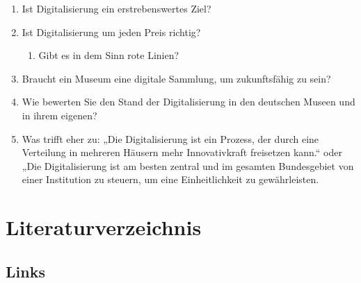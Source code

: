 \documentclass[a4paper,12pt,ngerman]{article}
\begin{document}
\begin{enumerate}
\item Ist Digitalisierung ein erstrebenswertes Ziel?
\item Ist Digitalisierung um jeden Preis richtig?
\begin{enumerate}
\item Gibt es in dem Sinn rote Linien?
\end{enumerate}
\item Braucht ein Museum eine digitale Sammlung, um zukunftsfähig zu sein?
\item Wie bewerten Sie den Stand der Digitalisierung in den deutschen Museen und in ihrem eigenen?
\item Was trifft eher zu: „Die Digitalisierung ist ein Prozess, der durch eine Verteilung in mehreren Häusern mehr Innovativkraft freisetzen kann.“ oder „Die Digitalisierung ist am besten zentral und im gesamten Bundesgebiet von einer Institution zu steuern, um eine Einheitlichkeit zu gewährleisten.
\end{enumerate}

\newpage
\section{Literaturverzeichnis}
\subsection{Links}
\end{document}
